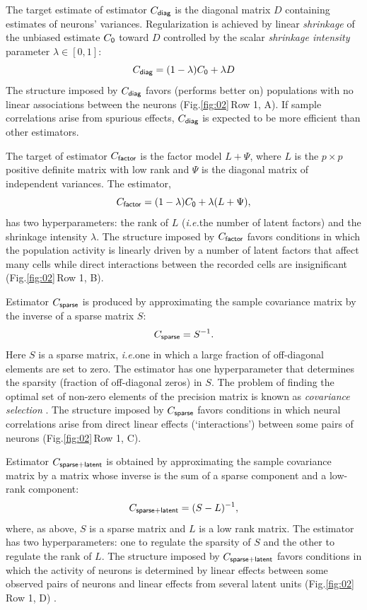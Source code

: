 \documentclass[10pt]{article}
\newcommand{\sq}[1]{\lq#1\rq}
\newcommand{\figref}[2]{Fig.\;\ref{fig:#1}\,#2}
\newcommand{\ie}{\emph{i.e.}\;}
\begin{document}
The target estimate of estimator $C_{\sf diag}$ is the diagonal matrix $D$ containing estimates of neurons' variances. Regularization is achieved by linear \emph{shrinkage} of the unbiased estimate $C_{\sf 0}$ toward $D$ controlled by the scalar \emph{shrinkage intensity} parameter $\lambda \in [0, 1]$:
\begin{equation}\label{eq:c-diag}
C_{\sf diag} = (1-\lambda) C_{\sf 0} + \lambda D
\end{equation}
The structure imposed by $C_{\sf diag}$ favors (performs better  on) populations   with no linear associations between the neurons (\figref{02}{Row 1, A}).  If sample correlations arise from spurious effects, $C_{\sf diag}$ is expected to be more efficient than other estimators. 

The target of estimator $C_{\sf factor}$ is the factor model $L + \Psi$, where $L$ is the $p\times p$ positive definite matrix with low rank and $\Psi$ is the diagonal matrix of independent variances.  The estimator, 
\begin{equation}\label{eq:c-factor}
C_{\sf factor} = (1-\lambda) C_{\sf 0} + \lambda (L + \Psi),
\end{equation}
has two hyperparameters: the rank of $L$ (\ie the number of latent factors) and the shrinkage intensity $\lambda$. The structure imposed by $C_{\sf factor}$ favors conditions in which the population activity is linearly driven by a number of latent factors that affect many cells while direct interactions between the recorded cells are insignificant (\figref{02}{Row 1, B}).   

Estimator $C_{\sf sparse}$ is produced by approximating the sample covariance matrix by the inverse of a sparse matrix $S$: 
\begin{equation}\label{eq:c-sparse}
C_{\sf sparse} = S^{-1}.
\end{equation}
Here $S$ is a sparse matrix, \ie one in which a large fraction of off-diagonal elements are set to zero.  The estimator has one hyperparameter that determines the sparsity (fraction of off-diagonal zeros) in $S$. The problem of finding the optimal set of non-zero elements of the precision matrix is known as \emph{covariance selection} \cite{Dempster:1972}. The structure imposed by $C_{\sf sparse}$ favors conditions in which neural correlations arise from direct linear effects (\sq{interactions}) between some pairs of neurons (\figref{02}{Row 1, C}).  


Estimator $C_{\sf sparse+latent}$ is obtained by approximating the sample covariance matrix by a matrix whose inverse is the sum of a sparse component and a low-rank component: 
\begin{equation}\label{eq:c-sl}
C_{\sf sparse+latent} = (S - L)^{-1},
\end{equation}
where, as above, $S$ is a sparse matrix and $L$ is a low rank matrix. The estimator has two hyperparameters: one to regulate the sparsity of $S$ and the other to regulate the rank of $L$. The structure imposed by $C_{\sf sparse+latent}$ favors conditions in which the activity of neurons is determined by linear effects between some observed pairs of neurons and linear effects from several latent units (\figref{02}{Row 1, D}) \cite{Chandrasekaran:2010,Ma:2013}.
\end{document}
